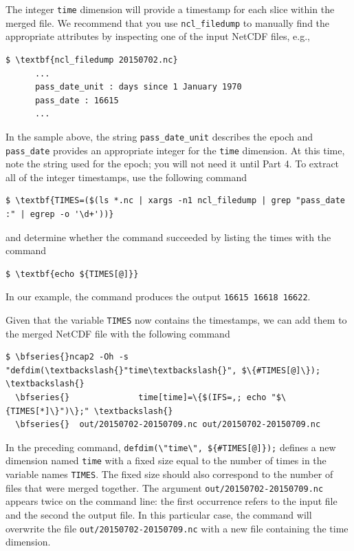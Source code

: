 \documentclass[11pt]{report}
\begin{document}
The integer \texttt{time} dimension will provide a timestamp for each slice within the merged file.
We recommend that you use \texttt{ncl\_filedump} to manually find the appropriate attributes by inspecting one of the input NetCDF files, e.g.,
\begin{Verbatim}[xleftmargin=0.5in,commandchars=\\\{\}]
$ \textbf{ncl_filedump 20150702.nc}
      ...
      pass_date_unit : days since 1 January 1970
      pass_date : 16615
      ...
\end{Verbatim}
In the sample above, the string \texttt{pass\_date\_unit} describes the epoch and \texttt{pass\_date} provides an appropriate integer for the \texttt{time} dimension.
At this time, note the string used for the epoch; you will not need it until Part 4.
To extract all of the integer timestamps, use the following command
\begin{Verbatim}[xleftmargin=0.5in,commandchars=\\\{\}]
$ \textbf{TIMES=($(ls *.nc | xargs -n1 ncl_filedump | grep "pass_date :" | egrep -o '\d+'))}
\end{Verbatim}
and determine whether the command succeeded by listing the times with the command
\begin{Verbatim}[xleftmargin=0.5in,commandchars=\\\{\}]
$ \textbf{echo ${TIMES[@]}}
\end{Verbatim}
In our example, the command produces the output \texttt{16615 16618 16622}.

Given that the variable \texttt{TIMES} now contains the timestamps, we can add them to the merged NetCDF file with the following command
\begin{Verbatim}[xleftmargin=0.5in,commandchars=\\\{\}]
$ \bfseries{}ncap2 -Oh -s "defdim(\textbackslash{}"time\textbackslash{}", $\{#TIMES[@]\}); \textbackslash{}
  \bfseries{}              time[time]=\{$(IFS=,; echo "$\{TIMES[*]\}")\};" \textbackslash{}
  \bfseries{}  out/20150702-20150709.nc out/20150702-20150709.nc
\end{Verbatim}

In the preceding command, \verb+defdim(\"time\", ${#TIMES[@]});+ defines a new dimension named \texttt{time} with a fixed size equal to the number of times in the variable names \texttt{TIMES}.
The fixed size should also correspond to the number of files that were merged together.
The argument \texttt{out/20150702-20150709.nc} appears twice on the command line: the first occurrence refers to the input file and the second the output file.
In this particular case, the command will overwrite the file \texttt{out/20150702-20150709.nc} with a new file containing the time dimension.
\end{document}
